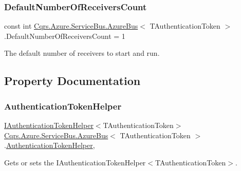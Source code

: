 \subsubsection{\texorpdfstring{Default\+Number\+Of\+Receivers\+Count}{DefaultNumberOfReceiversCount}}
{\footnotesize\ttfamily const int \hyperlink{classCqrs_1_1Azure_1_1ServiceBus_1_1AzureBus}{Cqrs.\+Azure.\+Service\+Bus.\+Azure\+Bus}$<$ T\+Authentication\+Token $>$.Default\+Number\+Of\+Receivers\+Count = 1\hspace{0.3cm}{\ttfamily [protected]}}



The default number of receivers to start and run. 



\subsection{Property Documentation}
\mbox{\label{classCqrs_1_1Azure_1_1ServiceBus_1_1AzureBus_a5250b75a5ef26d52a96da74777958519_a5250b75a5ef26d52a96da74777958519}} 
\subsubsection{\texorpdfstring{Authentication\+Token\+Helper}{AuthenticationTokenHelper}}
{\footnotesize\ttfamily \hyperlink{interfaceCqrs_1_1Authentication_1_1IAuthenticationTokenHelper}{I\+Authentication\+Token\+Helper}$<$T\+Authentication\+Token$>$ \hyperlink{classCqrs_1_1Azure_1_1ServiceBus_1_1AzureBus}{Cqrs.\+Azure.\+Service\+Bus.\+Azure\+Bus}$<$ T\+Authentication\+Token $>$.\hyperlink{classCqrs_1_1Authentication_1_1AuthenticationTokenHelper}{Authentication\+Token\+Helper}\hspace{0.3cm}{\ttfamily [get]}, {\ttfamily [protected]}}



Gets or sets the I\+Authentication\+Token\+Helper$<$\+T\+Authentication\+Token$>$. 

\mbox{\label{classCqrs_1_1Azure_1_1ServiceBus_1_1AzureBus_afc7a8e0c0a739b2a807eacac8f6c5397_afc7a8e0c0a739b2a807eacac8f6c5397}} 
